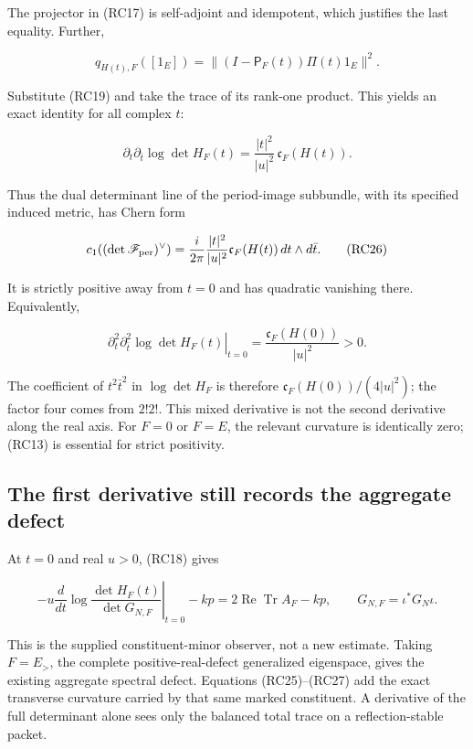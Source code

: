 \documentclass[
  11pt,
]{article}
\begin{document}
The projector in (RC17) is self-adjoint and idempotent, which justifies
the last equality. Further,

\[
q_{H(t),F}([1_E])
=\|(I-\mathsf P_F(t))\Pi(t)1_E\|^2.
\tag{RC24}
\]

Substitute (RC19) and take the trace of its rank-one product. This
yields an exact identity for all complex \(t\):

\[
\boxed{\partial_t\partial_{\bar t}\log\det H_F(t)
=\frac{|t|^2}{|u|^2}\,\mathfrak c_F(H(t)).}
\tag{RC25}
\]

Thus the dual determinant line of the period-image subbundle, with its
specified induced metric, has Chern form

\[
c_1((\det\mathscr F_{\rm per})^\vee)
=\frac{i}{2\pi}\frac{|t|^2}{|u|^2}
\mathfrak c_F(H(t))\,dt\wedge d\bar t.
\tag{RC26}
\]

It is strictly positive away from \(t=0\) and has quadratic vanishing
there. Equivalently,

\[
\boxed{\left.\partial_t^2\partial_{\bar t}^2
\log\det H_F(t)\right|_{t=0}
=\frac{\mathfrak c_F(H(0))}{|u|^2}>0.}
\tag{RC27}
\]

The coefficient of \(t^2\bar t^2\) in \(\log\det H_F\) is therefore
\(\mathfrak c_F(H(0))/(4|u|^2)\); the factor four comes from \(2!2!\).
This mixed derivative is not the second derivative along the real axis.
For \(F=0\) or \(F=E\), the relevant curvature is identically zero;
(RC13) is essential for strict positivity.

\subsection{The first derivative still records the aggregate
defect}\label{the-first-derivative-still-records-the-aggregate-defect}

At \(t=0\) and real \(u>0\), (RC18) gives

\[
-u\left.\frac{d}{dt}
\log\frac{\det H_F(t)}{\det G_{N,F}}\right|_{t=0}-kp
=2\operatorname{Re}\operatorname{Tr}A_F-kp,
\qquad G_{N,F}=\iota^*G_N\iota.
\tag{RC28}
\]

This is the supplied constituent-minor observer, not a new estimate.
Taking \(F=E_>\), the complete positive-real-defect generalized
eigenspace, gives the existing aggregate spectral defect. Equations
(RC25)--(RC27) add the exact transverse curvature carried by that same
marked constituent. A derivative of the full determinant alone sees only
the balanced total trace on a reflection-stable packet.
\end{document}
